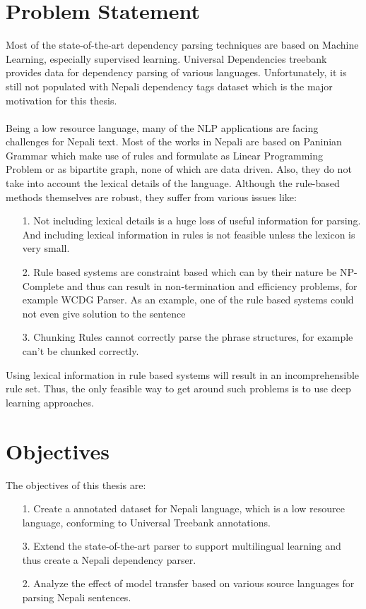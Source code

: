 \section {Problem Statement}
Most of the state-of-the-art dependency parsing techniques are based on
Machine Learning, especially supervised learning.  Universal Dependencies
\cite{nivreUD} treebank provides data for dependency parsing of various
languages. Unfortunately, it is still not populated with Nepali dependency
tags dataset which is the major motivation for this thesis.
\\~\\
Being a low resource language, many of the NLP applications are facing
challenges for Nepali text. Most of the works in Nepali are based on Paninian
Grammar \cite{paninianEng,yajnik1,yajnik2} which make use of
rules\cite{balCompGrammar} and formulate as Linear Programming
Problem\cite{yajnik2} or as bipartite graph\cite{yajnik1}, none of which are
data driven. Also, they do not take into account the lexical details of the
language. Although the rule-based methods themselves are robust, they suffer
from various issues like:
\begin{itemize}
    \item[1.] Not including lexical details is a huge loss of useful
        information for parsing. And including lexical information in rules is
        not feasible unless the lexicon is very small.
    \item[2.] Rule based systems are constraint based which can by their nature
        be NP-Complete and thus can result in non-termination and efficiency
        problems, for example WCDG Parser\cite{compareRuleStatistical}. As an
        example, one of the rule based systems could not even give solution to the sentence
    \item[3.] Chunking Rules cannot correctly parse the phrase structures, for
        example  can't be chunked correctly.
\end{itemize}
Using lexical information in rule based systems will result in an
incomprehensible rule set. Thus, the only feasible way to get around such
problems is to use deep learning approaches.

\section {Objectives}
The objectives of this thesis are:
\begin{itemize}
    \item[1.] Create a annotated dataset for Nepali language, which is a low resource language, conforming to Universal Treebank annotations.
    \item[3.] Extend the state-of-the-art parser to support multilingual learning and thus create a Nepali dependency parser.
    \item[2.] Analyze the effect of model transfer based on various source languages for parsing Nepali sentences.
\end{itemize}

